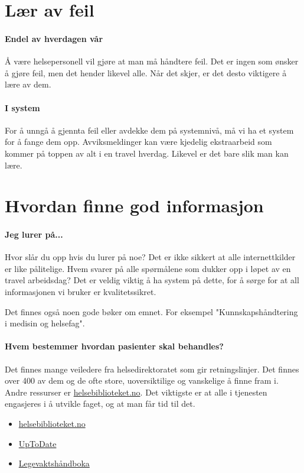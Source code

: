 		\section{Lær av feil}
			\paragraph{Endel av hverdagen vår\\}
				Å være helsepersonell vil gjøre at man må håndtere feil. Det er ingen som ønsker å gjøre feil, men det hender likevel alle. Når det skjer, er det desto viktigere å lære av dem.
			\paragraph{I system\\}
				For å unngå å gjennta feil eller avdekke dem på systemnivå, må vi ha et system for å fange dem opp. Avviksmeldinger kan være kjedelig ekstraarbeid som kommer på toppen av alt i en travel hverdag. Likevel er det bare slik man kan lære.
		\section{Hvordan finne god informasjon}
			\paragraph{Jeg lurer på...\\}
				Hvor slår du opp hvis du lurer på noe? Det er ikke sikkert at alle internettkilder er like pålitelige. Hvem svarer på alle spørmålene som dukker opp i løpet av en travel arbeidsdag? Det er veldig viktig å ha system på dette, for å sørge for at all informasjonen vi bruker er kvalitetssikret. \par

				Det finnes også noen gode bøker om emnet. For eksempel "Kunnskapshåndtering i medisin og helsefag"\cite{FA-Klovning}.
			\paragraph{Hvem bestemmer hvordan pasienter skal behandles?\\}
				Det finnes mange veiledere fra helsedirektoratet som gir retningslinjer. Det finnes over 400 av dem og de ofte store, uoversiktilige og vanskelige å finne fram i. Andre ressurser er \href{http://www.helsebiblioteket.no/}{helsebiblioteket.no}. Det viktigste er at alle i tjenesten engasjeres i å utvikle faget, og at man får tid til det. 
			\begin{itemize}
				\item \href{http://www.helsebiblioteket.no/}{helsebiblioteket.no}
				\item \href{http://www.uptodate.no/}{UpToDate}
				\item \href{http://www.lvh.no/}{Legevaktshåndboka}
			\end{itemize}
			
